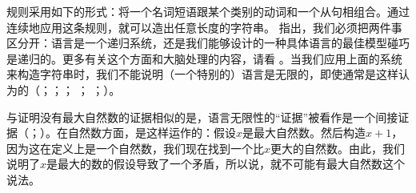 \zl
规则采用如下的形式：将一个名词短语跟某个类别的动词和一个从句相组合。通过连续地应用这条规则，就可以造出任意长度的字符串。 \citet{PS2010a}指出，我们必须把两件事区分开：语言是一个递归系统，还是我们能够设计的一种具体语言的最佳模型碰巧是递归的。更多有关这个方面和大脑处理的内容，请看 。当我们应用上面的系统来构造字符串时，我们不能说明（一个特别的）语言是无限的，即使通常是这样认为的（\citealp[--106]{Bierwisch66a}；\citealp[]{Pinker94a}；\citealp*[]{HCF2002a}； \citealp[]{MuellerLehrbuch1}；
\citealp*[]{HNG2005a}；\citealp[]{KS2008a-u}）。

与证明没有最大自然数的证据相似的是，语言无限性的“证据”被看作是一个间接证据（\citealp[--106]{Bierwisch66a}；\citealp[]{Pinker94a}）。在自然数方面，是这样运作的：假设$x$是最大自然数。然后构造$x + 1$，因为这在定义上是一个自然数，我们现在找到一个比$x$更大的自然数。由此，我们说明了$x$是最大的数的假设导致了一个矛盾，所以说，就不可能有最大自然数这个说法。

